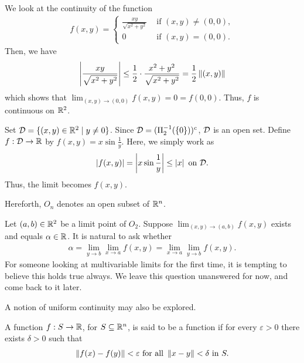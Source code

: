 \begin{example}
    We look at the continuity of the function
    \begin{align}
        f(x,y) = \begin{cases}
            \frac{xy}{\sqrt{x^{2}+y^{2}}} &\text{ if } (x,y) \neq (0,0),\\
            0 &\text{ if } (x,y) = (0,0).
        \end{cases}
    \end{align}
    Then, we have
    \begin{align}
        \left| \frac{xy}{\sqrt{x^{2}+y^{2}}} \right| \leq \frac{1}{2} \cdot \frac{x^{2}+y^{2}}{\sqrt{x^{2}+y^{2}}} = \frac{1}{2}\left\lVert(x,y)\right\rVert
    \end{align}
    which shows that $\lim_{(x,y) \to (0,0)} f(x,y) = 0 = f(0,0)$. Thus, $f$ is continuous on $\mathbb{R}^{2}$.
\end{example}

\begin{example}
    Set $\mathcal{D} = \{(x,y) \in \mathbb{R}^{2} \mid y \neq 0\}$. Since $\mathcal{D} = (\Pi_{2}^{-1}(\{0\}))^{c}$, $\mathcal{D}$ is an open set. Define $f:\mathcal{D} \to \mathbb{R}$ by $f(x,y) = x \sin \frac{1}{y}$. Here, we simply work as
    \begin{align}
        \left| f(x,y) \right| = \left| x \sin \frac{1}{y} \right| \leq \left| x \right| \text{ on } \mathcal{D}.
    \end{align}
    Thus, the limit becomes $f(x,y)$.
\end{example}

Hereforth, $O_{n}$ denotes an open subset of $\mathbb{R}^{n}$.
\begin{remark}
    Let $(a,b) \in \mathbb{R}^{2}$ be a limit point of $O_{2}$. Suppose $\lim_{(x,y)\to(a,b)} f(x,y)$ exists and equals $\alpha \in \mathbb{R}$. It is natural to ask whether
    \begin{align}
        \alpha = \lim_{y \to b} \lim_{x \to a} f(x,y) = \lim_{x \to a} \lim_{y \to b} f(x,y).
    \end{align}
    For someone looking at multivariable limits for the first time, it is tempting to believe this holds true always. We leave this question unanswered for now, and come back to it later.
\end{remark}

A notion of uniform continuity may also be explored.
\begin{definition}
    A function $f:S \to \mathbb{R}$, for $S \subseteq \mathbb{R}^{n}$, is said to be a  function if for every $\varepsilon > 0$ there exists $\delta > 0$ such that
    \begin{align}
        \left\lVert f(x)-f(y)\right\rVert < \varepsilon \text{ for all } \left\lVert x-y\right\rVert < \delta \text{ in } S.
    \end{align}
\end{definition}

